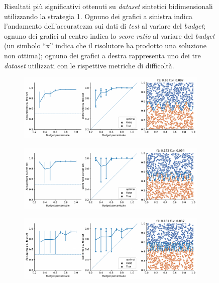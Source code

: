 \begin{figure}[b!]
\begin{subfigure}{\textwidth}
    \end{subfigure}%
    \caption[Risultati su \emph{dataset} sintetici utilizzando la strategia 1.]{Risultati più significativi ottenuti su \emph{dataset} sintetici bidimensionali utilizzando la strategia 1. Ognuno dei grafici a sinistra indica l'andamento dell'accuratezza sui dati di \emph{test} al variare del \emph{budget}; ognuno dei grafici al centro indica lo \emph{score ratio} al variare del \emph{budget} (un simbolo ``x'' indica che il risolutore ha prodotto una soluzione non ottima); ognuno dei grafici a destra rappresenta uno dei tre \emph{dataset} utilizzati con le rispettive metriche di difficoltà.}
\end{figure}
\begin{figure}[ht]\ContinuedFloat
    \begin{subfigure}{\textwidth}
        \centering
        \includegraphics[width=.8\textwidth]{img/2d/12.pdf}
    \end{subfigure}%
    \hfill
    \begin{subfigure}{\textwidth}
        \centering
        \includegraphics[width=.8\textwidth]{img/2d/13.pdf}
    \end{subfigure}%
    \hfill
    \begin{subfigure}{\textwidth}
        \centering
        \includegraphics[width=.8\textwidth]{img/2d/14.pdf}
    \end{subfigure}%

\end{figure}

